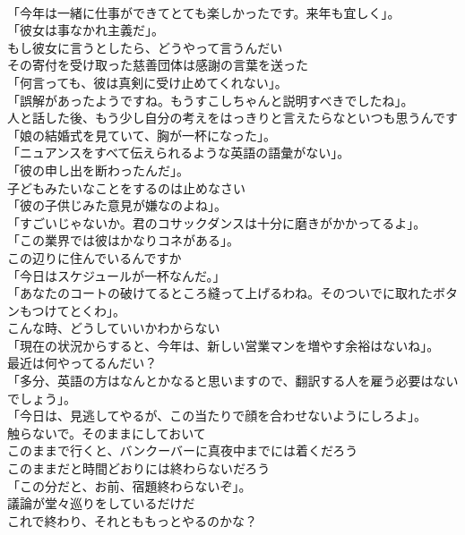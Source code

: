 \documentclass[8pt]{extreport}
\begin{document}
\begin{CJK}{UTF8}{min}
\\	「今年は一緒に仕事ができてとても楽しかったです。来年も宜しく」。	
\\	「彼女は事なかれ主義だ」。	
\\	もし彼女に言うとしたら、どうやって言うんだい	
\\	その寄付を受け取った慈善団体は感謝の言葉を送った	
\\	「何言っても、彼は真剣に受け止めてくれない」。	
\\	「誤解があったようですね。もうすこしちゃんと説明すべきでしたね」。	
\\	人と話した後、もう少し自分の考えをはっきりと言えたらなといつも思うんです	
\\	「娘の結婚式を見ていて、胸が一杯になった」。	
\\	「ニュアンスをすべて伝えられるような英語の語彙がない」。	
\\	「彼の申し出を断わったんだ」。	
\\	子どもみたいなことをするのは止めなさい	
\\	「彼の子供じみた意見が嫌なのよね」。	
\\	「すごいじゃないか。君のコサックダンスは十分に磨きがかかってるよ」。	
\\	「この業界では彼はかなりコネがある」。	
\\	この辺りに住んでいるんですか	
\\	「今日はスケジュールが一杯なんだ。」	
\\	「あなたのコートの破けてるところ縫って上げるわね。そのついでに取れたボタンもつけてとくわ」。	
\\	こんな時、どうしていいかわからない	
\\	「現在の状況からすると、今年は、新しい営業マンを増やす余裕はないね」。	
\\	最近は何やってるんだい？	
\\	「多分、英語の方はなんとかなると思いますので、翻訳する人を雇う必要はないでしょう」。	
\\	「今日は、見逃してやるが、この当たりで顔を合わせないようにしろよ」。	
\\	触らないで。そのままにしておいて	
\\	このままで行くと、バンクーバーに真夜中までには着くだろう	
\\	このままだと時間どおりには終わらないだろう	
\\	「この分だと、お前、宿題終わらないぞ」。	
\\	議論が堂々巡りをしているだけだ	
\\	これで終わり、それとももっとやるのかな？	

\end{CJK}
\end{document}
